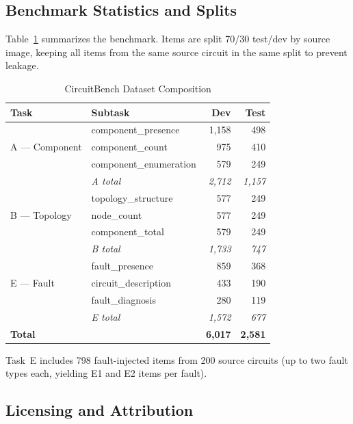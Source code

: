 \documentclass[conference]{IEEEtran}
\begin{document}
\subsection{Benchmark Statistics and Splits}

Table~\ref{tab:dataset} summarizes the benchmark.
Items are split 70/30 test/dev by source image, keeping all items
from the same source circuit in the same split to prevent leakage.

\begin{table}[t]
\centering
\caption{CircuitBench Dataset Composition}
\label{tab:dataset}
\begin{tabular}{llrr}
\toprule
\textbf{Task} & \textbf{Subtask} & \textbf{Dev} & \textbf{Test} \\
\midrule
\multirow{3}{*}{A --- Component}
  & component\_presence    & 1{,}158 &   498 \\
  & component\_count       &    975  &   410 \\
  & component\_enumeration &    579  &   249 \\
  & \textit{A total}       & \textit{2{,}712} & \textit{1{,}157} \\
\midrule
\multirow{3}{*}{B --- Topology}
  & topology\_structure    &    577  &   249 \\
  & node\_count            &    577  &   249 \\
  & component\_total       &    579  &   249 \\
  & \textit{B total}       & \textit{1{,}733} & \textit{747} \\
\midrule
\multirow{3}{*}{E --- Fault}
  & fault\_presence        &    859  &   368 \\
  & circuit\_description   &    433  &   190 \\
  & fault\_diagnosis       &    280  &   119 \\
  & \textit{E total}       & \textit{1{,}572} & \textit{677} \\
\midrule
\textbf{Total} & & \textbf{6{,}017} & \textbf{2{,}581} \\
\bottomrule
\end{tabular}
\vspace{2pt}

\footnotesize{Task~E includes 798 fault-injected items from 200 source
circuits (up to two fault types each, yielding E1 and E2 items per fault).}
\end{table}

\subsection{Licensing and Attribution}
\end{document}

